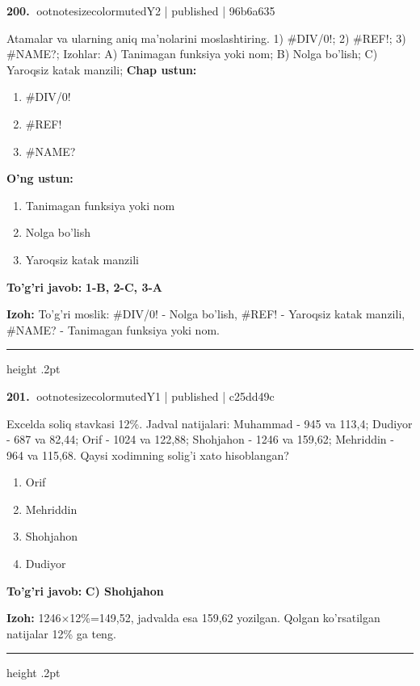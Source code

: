 \documentclass[10pt,a4paper]{article}
\begin{document}
\textbf{\color{ink}200.} {ootnotesizecolor{muted}Y2 | published | 96b6a635}
\par
Atamalar va ularning aniq ma'nolarini moslashtiring.  1) \#DIV/0!;  2) \#REF!;  3) \#NAME?;  Izohlar: A) Tanimagan funksiya yoki nom;  B) Nolga bo'lish;  C) Yaroqsiz katak manzili;
\textbf{Chap ustun:}\begin{enumerate}[label=\arabic*),leftmargin=9mm]
\item \#DIV/0!
\item \#REF!
\item \#NAME?
\end{enumerate}
\textbf{O'ng ustun:}\begin{enumerate}[label=\Alph*),leftmargin=9mm]
\item Tanimagan funksiya yoki nom
\item Nolga bo'lish
\item Yaroqsiz katak manzili
\end{enumerate}
\begin{tcolorbox}[enhanced,breakable,colback=teal!4,colframe=teal!55!black,boxrule=0.45pt,arc=1.2mm,left=2.8mm,right=2.8mm,top=2mm,bottom=2mm]
\textbf{\color{teal}To'g'ri javob:} \textbf{1-B, 2-C, 3-A}
\par\smallskip
\textbf{Izoh:} To'g'ri moslik: \#DIV/0! - Nolga bo'lish, \#REF! - Yaroqsiz katak manzili, \#NAME? - Tanimagan funksiya yoki nom.
\end{tcolorbox}
\vspace{2mm}\hrule height .2pt\vspace{2mm}

\textbf{\color{ink}201.} {ootnotesizecolor{muted}Y1 | published | c25dd49c}
\par
Excelda soliq stavkasi 12\%. Jadval natijalari: Muhammad - 945 va 113,4; Dudiyor - 687 va 82,44; Orif - 1024 va 122,88; Shohjahon - 1246 va 159,62; Mehriddin - 964 va 115,68. Qaysi xodimning solig'i xato hisoblangan?
\begin{enumerate}[label=\Alph*),leftmargin=9mm]
\item Orif
\item Mehriddin
\item Shohjahon
\item Dudiyor
\end{enumerate}
\begin{tcolorbox}[enhanced,breakable,colback=teal!4,colframe=teal!55!black,boxrule=0.45pt,arc=1.2mm,left=2.8mm,right=2.8mm,top=2mm,bottom=2mm]
\textbf{\color{teal}To'g'ri javob:} \textbf{C) Shohjahon}
\par\smallskip
\textbf{Izoh:} 1246\ensuremath{\times}12\%=149,52, jadvalda esa 159,62 yozilgan. Qolgan ko'rsatilgan natijalar 12\% ga teng.
\end{tcolorbox}
\vspace{2mm}\hrule height .2pt\vspace{2mm}
\end{document}
